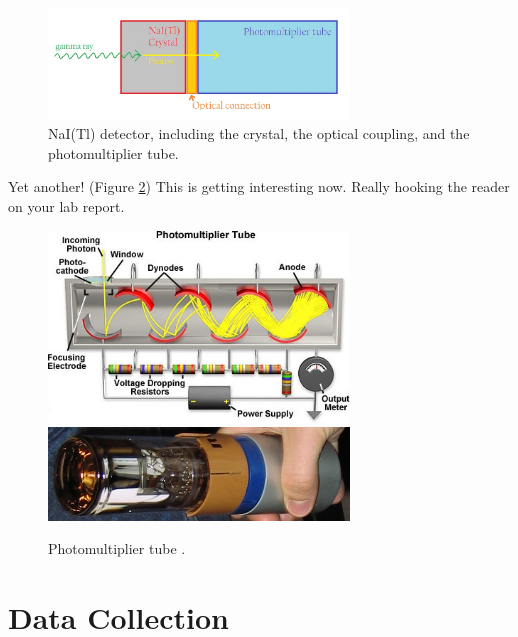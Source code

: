 \documentclass[10pt,letterpaper]{journal}
\begin{document}
\begin{figure}[H]
  \begin{center}
    \includegraphics[width=8cm]{scintillator.jpg}
  \end{center}
  \caption{\scriptsize{NaI(Tl) detector, including the crystal, the optical coupling, and the photomultiplier tube.}}
  \label{fig:Scint}
\end{figure}

Yet another! (Figure \ref{fig:PMT}) This is getting interesting now. Really hooking the reader on your lab report.

\begin{figure}[H]
  \begin{center}
    \includegraphics[width=8cm]{photomultiplier.jpg}
    \includegraphics[width=8cm]{pm-base.jpg}
  \end{center}
  \caption{\scriptsize{Photomultiplier tube \cite{bib:PMT}. \label{fig:PMT}}}
\end{figure}

\section{Data Collection}
\end{document}
